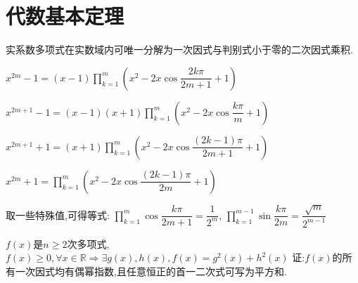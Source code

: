 \section{代数基本定理}
实系数多项式在实数域内可唯一分解为一次因式与判别式小于零的二次因式乘积.

$ x^{2m}-1=(x-1) \prod_{k=1}^m{( x^2-2x\cos\dfrac{2k\pi}{2m+1}+1 )}$

$ x^{2m+1}-1 =(x-1)(x+1)\prod_{k=1}^m{(x^2-2x\cos\dfrac{k\pi}{m}+1)}$ 

$ x^{2m+1}+1=(x+1)\prod_{k=1}^m{( x^2-2x\cos\dfrac{(2k-1)\pi}{2m+1}+1 )}$

$ x^{2m}+1=\prod_{k=1}^m{(x^2-2x\cos\dfrac{(2k-1)\pi}{2m}+1)}$

取一些特殊值,可得等式:
$ \prod_{k=1}^m{\cos\dfrac{k\pi}{2m+1}}=\dfrac{1}{2^m}$,
$ \prod_{k=1}^{m-1}{\sin\dfrac{k\pi}{2m}}=\dfrac{\sqrt{m}}{2^{m-1}}$


$ f(x)$是$ n\ge2$次多项式,$ f(x)\ge 0,\forall x\in \mathbb{R}\Rightarrow \exists g(x),h(x),f(x)=g^2(x)+h^2(x)$
证:$ f(x)$的所有一次因式均有偶幂指数,且任意恒正的首一二次式可写为平方和.
